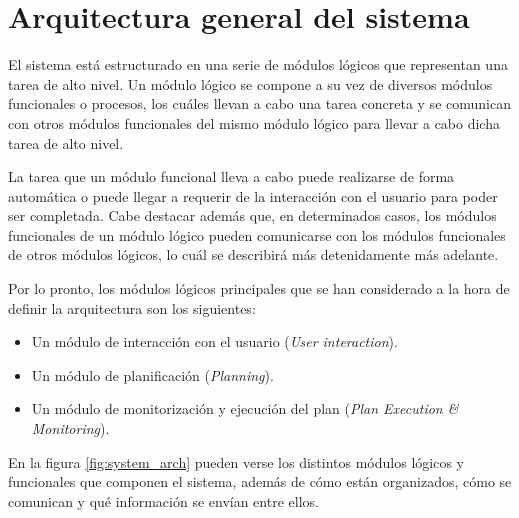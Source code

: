 
\chapter{Arquitectura general del sistema}

El sistema está estructurado en una serie de módulos lógicos que representan una
tarea de alto nivel. Un módulo lógico se compone a su vez de diversos módulos
funcionales o procesos, los cuáles llevan a cabo una tarea concreta y se comunican con
otros módulos funcionales del mismo módulo lógico para llevar a cabo dicha tarea de alto
nivel.

La tarea que un módulo funcional lleva a cabo puede realizarse de forma automática o
puede llegar a requerir de la interacción con el usuario para poder ser completada.
Cabe destacar además que, en determinados casos, los módulos funcionales de un módulo
lógico pueden comunicarse con los módulos funcionales de otros módulos lógicos, lo cuál se
describirá más detenidamente más adelante.

Por lo pronto, los módulos lógicos principales que se han considerado a la hora de definir
la arquitectura son los siguientes:

\begin{itemize}[label=\textbullet]
    \item Un módulo de interacción con el usuario (\textit{User interaction}).
    \item Un módulo de planificación (\textit{Planning}).
    \item Un módulo de monitorización y ejecución del plan (\textit{Plan Execution \& Monitoring}).
\end{itemize}

En la figura \ref{fig:system_arch} pueden verse los distintos módulos lógicos y funcionales que
componen el sistema, además de cómo están organizados, cómo se comunican y qué información se
envían entre ellos.

